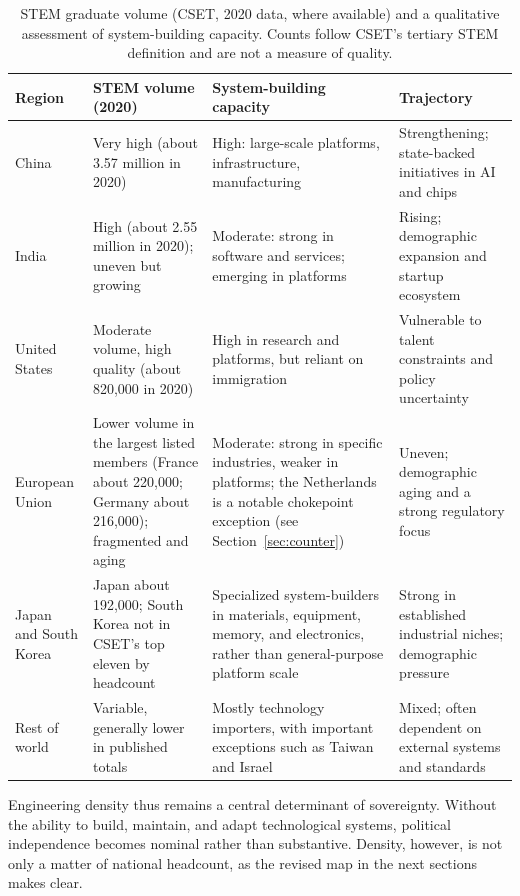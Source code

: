 \documentclass[12pt,letterpaper]{article}
\begin{document}
\begin{table}[!htbp]
\centering
\caption{STEM graduate volume (CSET, 2020 data, where available) and a qualitative assessment of system-building capacity. Counts follow CSET's tertiary STEM definition and are not a measure of quality.}
\label{tab:stem}
\begin{tabularx}{\textwidth}{@{}P{2.7cm}P{3.3cm}L P{3.2cm}@{}}
\toprule
\textbf{Region} & \textbf{STEM volume (2020)} & \textbf{System-building capacity} & \textbf{Trajectory} \\
\midrule
China & Very high (about 3.57 million in 2020) & High: large-scale platforms, infrastructure, manufacturing & Strengthening; state-backed initiatives in AI and chips \\[0.4em]
India & High (about 2.55 million in 2020); uneven but growing & Moderate: strong in software and services; emerging in platforms & Rising; demographic expansion and startup ecosystem \\[0.4em]
United States & Moderate volume, high quality (about 820{,}000 in 2020) & High in research and platforms, but reliant on immigration & Vulnerable to talent constraints and policy uncertainty \\[0.4em]
European Union & Lower volume in the largest listed members (France about 220{,}000; Germany about 216{,}000); fragmented and aging & Moderate: strong in specific industries, weaker in platforms; the Netherlands is a notable chokepoint exception (see Section~\ref{sec:counter}) & Uneven; demographic aging and a strong regulatory focus \\[0.4em]
Japan and South Korea & Japan about 192{,}000; South Korea not in CSET's top eleven by headcount & Specialized system-builders in materials, equipment, memory, and electronics, rather than general-purpose platform scale & Strong in established industrial niches; demographic pressure \\[0.4em]
Rest of world & Variable, generally lower in published totals & Mostly technology importers, with important exceptions such as Taiwan and Israel & Mixed; often dependent on external systems and standards \\
\bottomrule
\end{tabularx}
\end{table}

Engineering density thus remains a central determinant of sovereignty. Without the ability to build, maintain, and adapt technological systems, political independence becomes nominal rather than substantive. Density, however, is not only a matter of national headcount, as the revised map in the next sections makes clear.
\end{document}
